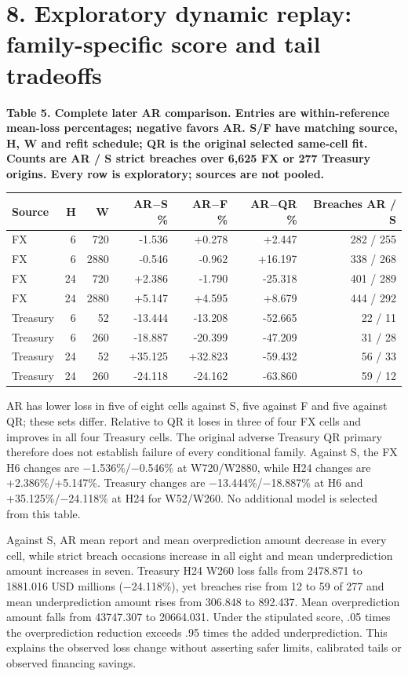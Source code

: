 \documentclass[10pt,a4paper]{article}
\begin{document}
\section*{8. Exploratory dynamic replay: family-specific score and tail tradeoffs}
\begin{center}
\begin{minipage}{\linewidth}
\small\textbf{Table 5. Complete later AR comparison. Entries are within-reference mean-loss percentages; negative favors AR. S/F have matching source, H, W and refit schedule; QR is the original selected same-cell fit. Counts are AR / S strict breaches over 6,625 FX or 277 Treasury origins. Every row is exploratory; sources are not pooled.}\par\medskip
\centering\fontsize{8}{10}\selectfont
\begin{tabular}{lrrrrrr}
\toprule
Source & H & W & AR\(-\)S \% & AR\(-\)F \% & AR\(-\)QR \% & Breaches AR / S \\
\midrule
FX & 6 & 720 & -1.536 & +0.278 & +2.447 & 282 / 255 \\
FX & 6 & 2880 & -0.546 & -0.962 & +16.197 & 338 / 268 \\
FX & 24 & 720 & +2.386 & -1.790 & -25.318 & 401 / 289 \\
FX & 24 & 2880 & +5.147 & +4.595 & +8.679 & 444 / 292 \\
Treasury & 6 & 52 & -13.444 & -13.208 & -52.665 & 22 / 11 \\
Treasury & 6 & 260 & -18.887 & -20.399 & -47.209 & 31 / 28 \\
Treasury & 24 & 52 & +35.125 & +32.823 & -59.432 & 56 / 33 \\
Treasury & 24 & 260 & -24.118 & -24.162 & -63.860 & 59 / 12 \\
\bottomrule
\end{tabular}
\end{minipage}
\end{center}
AR has lower loss in five of eight cells against S, five against F and five against QR; these sets differ. Relative to QR it loses in three of four FX cells and improves in all four Treasury cells. The original adverse Treasury QR primary therefore does not establish failure of every conditional family. Against S, the FX H6 changes are \(-\)1.536\%/\(-\)0.546\% at W720/W2880, while H24 changes are +2.386\%/+5.147\%. Treasury changes are \(-\)13.444\%/\(-\)18.887\% at H6 and +35.125\%/\(-\)24.118\% at H24 for W52/W260. No additional model is selected from this table.

Against S, AR mean report and mean overprediction amount decrease in every cell, while strict breach occasions increase in all eight and mean underprediction amount increases in seven. Treasury H24 W260 loss falls from 2478.871 to 1881.016 USD millions (\(-\)24.118\%), yet breaches rise from 12 to 59 of 277 and mean underprediction amount rises from 306.848 to 892.437. Mean overprediction amount falls from 43747.307 to 20664.031. Under the stipulated score, .05 times the overprediction reduction exceeds .95 times the added underprediction. This explains the observed loss change without asserting safer limits, calibrated tails or observed financing savings.
\end{document}
